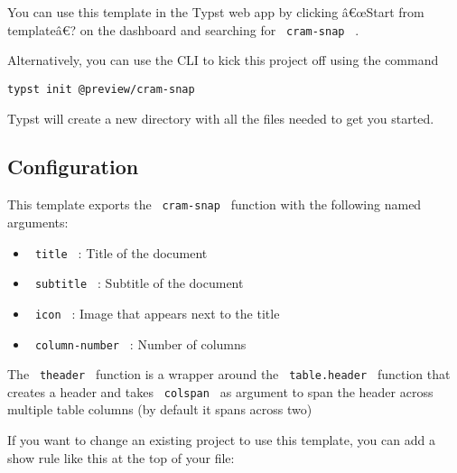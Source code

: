 You can use this template in the Typst web app by clicking â€œStart from
templateâ€? on the dashboard and searching for \texttt{\ cram-snap\ } .

Alternatively, you can use the CLI to kick this project off using the
command

\begin{verbatim}
typst init @preview/cram-snap
\end{verbatim}

Typst will create a new directory with all the files needed to get you
started.

\subsection{Configuration}\label{configuration}

This template exports the \texttt{\ cram-snap\ } function with the
following named arguments:

\begin{itemize}
\tightlist
\item
  \texttt{\ title\ } : Title of the document
\item
  \texttt{\ subtitle\ } : Subtitle of the document
\item
  \texttt{\ icon\ } : Image that appears next to the title
\item
  \texttt{\ column-number\ } : Number of columns
\end{itemize}

The \texttt{\ theader\ } function is a wrapper around the
\texttt{\ table.header\ } function that creates a header and takes
\texttt{\ colspan\ } as argument to span the header across multiple
table columns (by default it spans across two)

If you want to change an existing project to use this template, you can
add a show rule like this at the top of your file:

\begin{Shaded}
\begin{Highlighting}[]


\NormalTok{)}


\NormalTok{)}
\end{Highlighting}
\end{Shaded}

